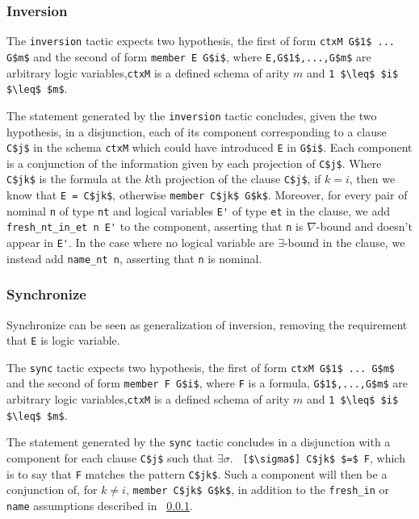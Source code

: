 \documentclass[nocopyrightspace,authoryear]{sigplanconf}
\begin{document}
\subsubsection{Inversion}
\label{subsec:inv}

The \lstinline|inversion| tactic expects two hypothesis, the first of form \lstinline|ctxM G$1$ ... G$m$| and the second of form \lstinline|member E G$i$|, where \lstinline|E,G$1$,...,G$m$| are arbitrary logic variables,\lstinline|ctxM| is a defined schema of arity $m$ and \lstinline|1 $\leq$ $i$ $\leq$ $m$|.

The statement generated by the \lstinline|inversion| tactic concludes, given the two hypothesis, in a disjunction, each of its component corresponding to a clause \lstinline|C$j$| in the schema \lstinline|ctxM| which could have introduced \lstinline|E| in \lstinline|G$i$|. Each component is a conjunction of the information given by each projection of \lstinline|C$j$|. Where \lstinline|C$jk$| is the formula at the $k$th projection of the clause \lstinline|C$j$|, if $k=i$, then we know that \lstinline|E = C$jk$|, otherwise \lstinline|member C$jk$ G$k$|. Moreover, for every pair of nominal \lstinline|n| of type \lstinline|nt| and logical variables \lstinline|E'| of type \lstinline|et| in the clause, we add \lstinline|fresh_nt_in_et n E'| to the component, asserting that \lstinline|n| is $\nabla$-bound and doesn't appear in \lstinline|E'|. In the case where no logical variable are $\exists$-bound in the clause, we instead add \lstinline|name_nt n|, asserting that \lstinline|n| is nominal.

\subsubsection{Synchronize}
Synchronize can be seen as generalization of inversion, removing the requirement that \lstinline|E| is logic variable. 

The \lstinline|sync| tactic expects two hypothesis, the first of form \lstinline|ctxM G$1$ ... G$m$| and the second of form \lstinline|member F G$i$|, where \lstinline|F| is a formula, \lstinline|G$1$,...,G$m$| are arbitrary logic variables,\lstinline|ctxM| is a defined schema of arity $m$ and \lstinline|1 $\leq$ $i$ $\leq$ $m$|.

The statement generated by the \lstinline|sync| tactic concludes in a disjunction with a component for each clause \lstinline|C$j$| such that $\exists \sigma.$ \lstinline| [$\sigma$] C$jk$ $=$ F|, which is to say that \lstinline|F| matches the pattern \lstinline|C$jk$|. Such a component will then be a conjunction of, for $k \neq i$, \lstinline|member C$jk$ G$k$|, in addition to the \lstinline|fresh_in| or \lstinline|name| assumptions described in ~\ref{subsec:inv}.
\end{document}
